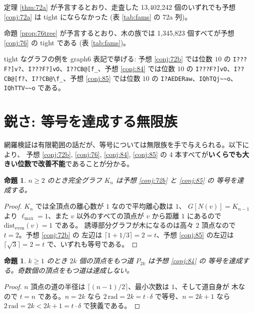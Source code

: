 \documentclass[paper=a4,fontsize=10.5pt,jafontsize=10.5pt]{jlreq}
\theoremstyle{plain}
\newtheorem{proposition}[theorem]{命題}
\theoremstyle{definition}
\begin{document}
定理 \ref{thm:72a} が予言するとおり、走査した 13,402,242 個のいずれでも予想 \ref{conj:72a} は tight にならなかった (表 \ref{tab:fams} の 72a 列)。

命題 \ref{prop:76tree} が予言するとおり、木の族では 1,345,823 個すべてが予想 \ref{conj:76} の tight である (表 \ref{tab:fams})。

tight なグラフの例を graph6 表記で挙げる: 予想 \ref{conj:72b} では位数 $10$ の \texttt{I???F?]v?}、\texttt{I???F?]vO}、\texttt{I??CB@[f\_}、予想 \ref{conj:84} では位数 $10$ の \texttt{I???F?]vO}、\texttt{I??CB@[f?}、\texttt{I??CB@\textbackslash{}f\_}、予想 \ref{conj:85} では位数 $10$ の \texttt{I?AEDERaw}、\texttt{IQhTQj\textasciitilde{}\textasciitilde{}o}、\texttt{IQhTTV\textasciitilde{}\textasciitilde{}o} である。

\section{鋭さ: 等号を達成する無限族}\label{sec:sharp}

網羅検証は有限範囲の話だが、等号については無限族を手で与えられる。以下により、
予想 \ref{conj:72b}, \ref{conj:76}, \ref{conj:84}, \ref{conj:85} の
4 本すべてが\textbf{いくらでも大きい位数で改善不能}であることが分かる。

\begin{proposition}\label{prop:kn}
$n \ge 2$ のとき完全グラフ $K_n$ は予想 \ref{conj:72b} と \ref{conj:85} の
等号を達成する。
\end{proposition}

\begin{proof}
$K_n$ では全頂点の離心数が $1$ なので平均離心数は $1$、
$G[N(v)] = K_{n-1}$ より $\ell_{\max} = 1$、また $v$ 以外のすべての頂点が
$v$ から距離 $1$ にあるので $\mathrm{dist}_{\mathrm{even}}(v) = 1$ である。
誘導部分グラフが木になるのは高々 2 頂点なので $t = 2$。予想 \ref{conj:72b} の
左辺は $\lceil 1 + 1/3 \rceil = 2 = t$、予想 \ref{conj:85} の左辺は
$\lceil \sqrt{3} \rceil = 2 = t$ で、いずれも等号である。
\end{proof}

\begin{proposition}\label{prop:path}
$k \ge 1$ のとき $2k$ 個の頂点をもつ道 $P_{2k}$ は予想 \ref{conj:84} の
等号を達成する。奇数個の頂点をもつ道は達成しない。
\end{proposition}

\begin{proof}
$n$ 頂点の道の半径は $\lceil (n-1)/2 \rceil$、最小次数は $1$、そして道自身が
木なので $t = n$ である。$n = 2k$ なら
$2\,\mathrm{rad} = 2k = t \cdot \delta$ で等号、$n = 2k+1$ なら
$2\,\mathrm{rad} = 2k < 2k+1 = t \cdot \delta$ で狭義である。
\end{proof}
\end{document}
